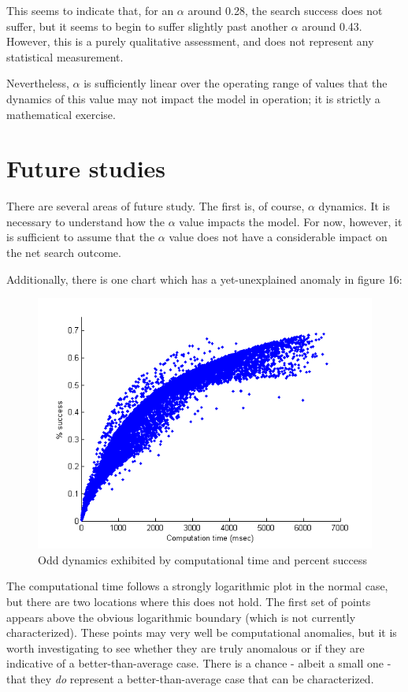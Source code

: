 \documentclass[a4paper]{article}
\begin{document}
This seems to indicate that, for an $\alpha$ around 0.28, the search success does not suffer, but it seems to begin to suffer slightly past another $\alpha$ around 0.43. However, this is a purely qualitative assessment, and does not represent any statistical measurement.

Nevertheless, $\alpha$ is sufficiently linear over the operating range of values that the dynamics of this value may not impact the model in operation; it is strictly a mathematical exercise.

\section{Future studies}

There are several areas of future study. The first is, of course, $\alpha$ dynamics. It is necessary to understand how the $\alpha$ value impacts the model. For now, however, it is sufficient to assume that the $\alpha$ value does not have a considerable impact on the net search outcome. 

Additionally, there is one chart which has a yet-unexplained anomaly in figure 16:

\begin{figure}[H]\begin{center}
\includegraphics[scale=0.75]{../Matlab/Images/CompTimePctSuccess.png}
\caption{Odd dynamics exhibited by computational time and percent success}
\end{center}\end{figure}

The computational time follows a strongly logarithmic plot in the normal case, but there are two locations where this does not hold. The first set of points appears above the obvious logarithmic boundary (which is not currently characterized). These points may very well be computational anomalies, but it is worth investigating to see whether they are truly anomalous or if they are indicative of a better-than-average case. There is a chance - albeit a small one - that they \textit{do} represent a better-than-average case that can be characterized. 
\end{document}
